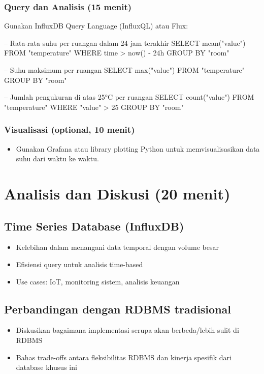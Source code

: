 \subsubsection{Query dan Analisis (15 menit)}
Gunakan InfluxDB Query Language (InfluxQL) atau Flux:

\begin{codebox}[language=SQL]
-- Rata-rata suhu per ruangan dalam 24 jam terakhir
SELECT mean("value") FROM "temperature" WHERE time > now() - 24h GROUP BY "room"

-- Suhu maksimum per ruangan
SELECT max("value") FROM "temperature" GROUP BY "room"

-- Jumlah pengukuran di atas 25°C per ruangan
SELECT count("value") FROM "temperature" WHERE "value" > 25 GROUP BY "room"
\end{codebox}

\subsubsection{Visualisasi (optional, 10 menit)}
\begin{itemize}
    \item Gunakan Grafana atau library plotting Python untuk memvisualisasikan data suhu dari waktu ke waktu.
\end{itemize}

\section{Analisis dan Diskusi (20 menit)}

\subsection{Time Series Database (InfluxDB)}
\begin{itemize}
    \item Kelebihan dalam menangani data temporal dengan volume besar
    \item Efisiensi query untuk analisis time-based
    \item Use cases: IoT, monitoring sistem, analisis keuangan
\end{itemize}

\subsection{Perbandingan dengan RDBMS tradisional}
\begin{itemize}
    \item Diskusikan bagaimana implementasi serupa akan berbeda/lebih sulit di RDBMS
    \item Bahas trade-offs antara fleksibilitas RDBMS dan kinerja spesifik dari database khusus ini
\end{itemize}

